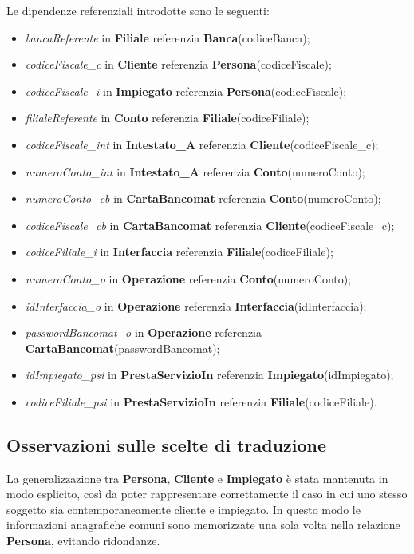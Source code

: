 Le dipendenze referenziali introdotte sono le seguenti:

\begin{itemize}
  \item \textit{bancaReferente} in \textbf{Filiale} referenzia \textbf{Banca}(codiceBanca);
  \item \textit{codiceFiscale\_c} in \textbf{Cliente} referenzia \textbf{Persona}(codiceFiscale);
  \item \textit{codiceFiscale\_i} in \textbf{Impiegato} referenzia \textbf{Persona}(codiceFiscale);
  \item \textit{filialeReferente} in \textbf{Conto} referenzia \textbf{Filiale}(codiceFiliale);
  \item \textit{codiceFiscale\_int} in \textbf{Intestato\_A} referenzia \textbf{Cliente}(codiceFiscale\_c);
  \item \textit{numeroConto\_int} in \textbf{Intestato\_A} referenzia \textbf{Conto}(numeroConto);
  \item \textit{numeroConto\_cb} in \textbf{CartaBancomat} referenzia \textbf{Conto}(numeroConto);
  \item \textit{codiceFiscale\_cb} in \textbf{CartaBancomat} referenzia \textbf{Cliente}(codiceFiscale\_c);
  \item \textit{codiceFiliale\_i} in \textbf{Interfaccia} referenzia \textbf{Filiale}(codiceFiliale);
  \item \textit{numeroConto\_o} in \textbf{Operazione} referenzia \textbf{Conto}(numeroConto);
  \item \textit{idInterfaccia\_o} in \textbf{Operazione} referenzia \textbf{Interfaccia}(idInterfaccia);
  \item \textit{passwordBancomat\_o} in \textbf{Operazione} referenzia \textbf{CartaBancomat}(passwordBancomat);
  \item \textit{idImpiegato\_psi} in \textbf{PrestaServizioIn} referenzia \textbf{Impiegato}(idImpiegato);
  \item \textit{codiceFiliale\_psi} in \textbf{PrestaServizioIn} referenzia \textbf{Filiale}(codiceFiliale).
\end{itemize}

\subsection{Osservazioni sulle scelte di traduzione}

La generalizzazione tra \textbf{Persona}, \textbf{Cliente} e \textbf{Impiegato} è stata mantenuta in modo esplicito, così da poter rappresentare correttamente il caso in cui uno stesso soggetto sia contemporaneamente cliente e impiegato. In questo modo le informazioni anagrafiche comuni sono memorizzate una sola volta nella relazione \textbf{Persona}, evitando ridondanze.

